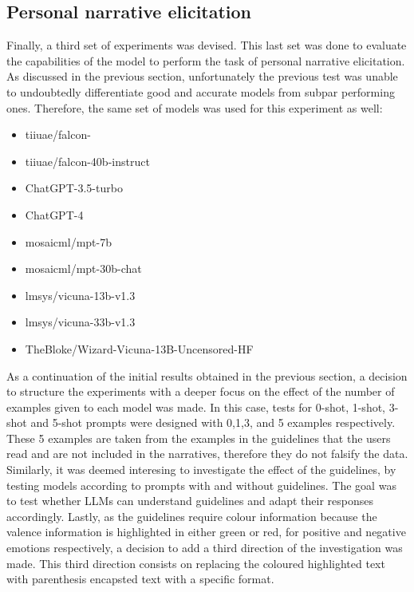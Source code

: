 \subsection{Personal narrative elicitation}
\label{cha:methodology-personal-narrative-elicitation}
Finally, a third set of experiments was devised. This last set was done to evaluate the capabilities of the model to perform the task of personal narrative elicitation.
As discussed in the previous section, unfortunately the previous test was unable to undoubtedly differentiate good and accurate models from subpar performing ones. Therefore, the same set of models was used for this experiment as well:
\begin{itemize}
    \item   tiiuae/falcon- \cite{falcon40b}
    \item   tiiuae/falcon-40b-instruct \cite{falcon40b}
    \item   ChatGPT-3.5-turbo \cite{chatgpt}
    \item   ChatGPT-4 \cite{openai2023gpt4}
    \item   mosaicml/mpt-7b \cite{mpt7b}
    \item   mosaicml/mpt-30b-chat \cite{mpt30b}
    \item   lmsys/vicuna-13b-v1.3 \cite{touvron2023llama}
    \item   lmsys/vicuna-33b-v1.3 \cite{touvron2023llama}
    \item   TheBloke/Wizard-Vicuna-13B-Uncensored-HF \cite{wizard-vicuna}
\end{itemize}
As a continuation of the initial results obtained in the previous section, a decision to structure the experiments with a deeper focus on the effect of the number of examples given to each model was made. In this case, tests for 0-shot, 1-shot, 3-shot and 5-shot prompts were designed with 0,1,3, and 5 examples respectively. These 5 examples are taken from the examples in the guidelines that the users read and are not included in the narratives, therefore they do not falsify the data. Similarly, it was deemed interesing to investigate the effect of the guidelines, by testing models according to prompts with and without guidelines. The goal was to test whether LLMs can understand guidelines and adapt their responses accordingly. Lastly, as the guidelines require colour information because the valence information is highlighted in either green or red, for positive and negative emotions respectively, a decision to add a third direction of the investigation was made. This third direction consists on replacing the coloured highlighted text with parenthesis encapsted text with a specific format.
